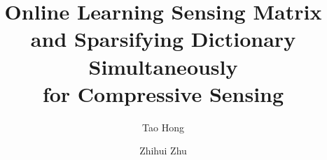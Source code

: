 \documentclass[final,5p,times,twocolumn]{elsarticle}
\begin{document}
\begin{frontmatter}



\title{Online Learning Sensing Matrix and Sparsifying Dictionary Simultaneously\\ for Compressive Sensing}


\author[TH]{Tao Hong}
\author[ZZ]{Zhihui Zhu}

	\address[TH]{Department
		of Computer Science, Technion - Israel Institute of Technology, Haifa, 32000, Israel.}%
	\address[ZZ]{Center for Imaging Science,
		Johns Hopkins University, Baltimore, MD 21218, USA} %



\end{frontmatter}
\end{document}
